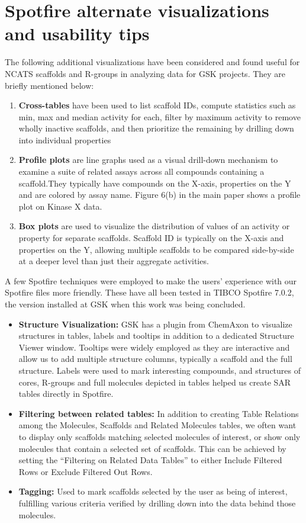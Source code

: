 \documentclass[11pt,letterpaper]{article}
\begin{document}
\newpage

\section{Spotfire alternate visualizations and usability tips}
\label{sec:spotviz-trick}
The following additional visualizations have been considered and found useful for NCATS scaffolds and R-groups in analyzing data for GSK projects. They are briefly mentioned below:
\begin{enumerate}
\item {\bf Cross-tables} have been used to list scaffold IDs, compute statistics such as min, max and median activity for each, filter by maximum activity to remove wholly inactive scaffolds, and then prioritize the remaining by drilling down into individual properties
\item {\bf Profile plots} are line graphs used as a visual drill-down mechanism to examine a suite of related assays across all compounds containing a scaffold.They typically have compounds on the X-axis, properties on the Y and are colored by assay name. Figure 6(b) in the main paper shows a profile plot on Kinase X data.
\item {\bf Box plots} are used to visualize the distribution of values of an activity or property for separate scaffolds. Scaffold ID is typically on the X-axis and properties on the Y, allowing multiple scaffolds to be compared side-by-side at a deeper level than just their aggregate activities. 
\end{enumerate}

A few Spotfire techniques were employed to make the users' experience with our Spotfire files more friendly. These have all been tested in TIBCO Spotfire 7.0.2, the version installed at GSK when this work was being concluded.
\begin{itemize}
\item {\bf Structure Visualization:} GSK has a plugin from ChemAxon to visualize structures in tables, labels and tooltips in addition to a dedicated Structure Viewer window. Tooltips were widely employed as they are interactive and allow us to add multiple structure columns, typically a scaffold and the full structure. Labels were used to mark interesting compounds, and structures of cores, R-groups and full molecules depicted in tables helped us create SAR tables directly in Spotfire.
\item {\bf Filtering between related tables:} In addition to creating Table Relations among the Molecules, Scaffolds and Related Molecules tables, we often want to display only scaffolds matching selected molecules of interest, or show only molecules that contain a selected set of scaffolds. This can be achieved by setting the ``Filtering on Related Data Tables'' to either Include Filtered Rows or Exclude Filtered Out Rows.
\item {\bf Tagging:} Used to mark scaffolds selected by the user as being of interest, fulfilling various criteria verified by drilling down into the data behind those molecules.    
\end{itemize}
\end{document}
